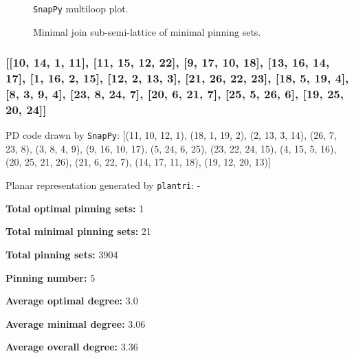 \documentclass{article}%
\begin{document}
\begin{multicols}{2}
\begin{figure}[H]
\centering

\caption{\texttt{SnapPy} multiloop plot.}
\label{fig:tex/img/[[18, 26, 1, 19], [19, 11, 20, 12], [4, 17, 5, 18], [5, 25, 6, 26], [1, 10, 2, 11], [20, 2, 21, 3], [12, 3, 13, 4], [24, 16, 25, 17], [6, 16, 7, 15], [9, 21, 10, 22], [13, 9, 14, 8], [23, 7, 24, 8], [.svg}
\end{figure}
\columnbreak

\begin{figure}[H]
\centering
\scalebox{0.8}{}
\caption{Minimal join sub-semi-lattice of minimal pinning sets.}
\label{fig:tex/img/[[18, 26, 1, 19], [19, 11, 20, 12], [4, 17, 5, 18], [5, 25, 6, 26], [1, 10, 2, 11], [20, 2, 21, 3], [12, 3, 13, 4], [24, 16, 25, 17], [6, 16, 7, 15], [9, 21, 10, 22], [13, 9, 14, 8], [23, 7, 24, 8], [.pgf}
\end{figure}
\end{multicols}

\newpage

\subsubsection{[[10, 14, 1, 11], [11, 15, 12, 22], [9, 17, 10, 18], [13, 16, 14, 17], [1, 16, 2, 15], [12, 2, 13, 3], [21, 26, 22, 23], [18, 5, 19, 4], [8, 3, 9, 4], [23, 8, 24, 7], [20, 6, 21, 7], [25, 5, 26, 6], [19, 25, 20, 24]]}

{\small\noindent PD code drawn by \texttt{SnapPy}: [(11, 10, 12, 1), (18, 1, 19, 2), (2, 13, 3, 14), (26, 7, 23, 8), (3, 8, 4, 9), (9, 16, 10, 17), (5, 24, 6, 25), (23, 22, 24, 15), (4, 15, 5, 16), (20, 25, 21, 26), (21, 6, 22, 7), (14, 17, 11, 18), (19, 12, 20, 13)]}

{\small\noindent Planar representation generated by \texttt{plantri}: -}

\begin{multicols}{2}
{\normalsize \noindent\textbf{Total optimal pinning sets:} 1

\noindent\textbf{Total minimal pinning sets:} 21

\noindent\textbf{Total pinning sets:} 3904

\noindent\textbf{Pinning number:} 5

}
\columnbreak

{\normalsize \noindent\textbf{Average optimal degree:} 3.0

\noindent\textbf{Average minimal degree:} 3.06

\noindent\textbf{Average overall degree:} 3.36

}
\end{multicols}
\end{document}
